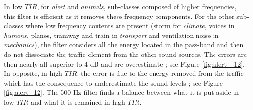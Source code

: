 \documentclass[twocolumn,a4paper,10pt]{article}
\begin{document}
In low $TIR$, for \textit{alert} and \textit{animals}, sub-classes composed of higher frequencies, this filter is efficient as it removes these frequency components. For the other sub-classes where low frequency contents are present (storm for \textit{climate}, voices in \textit{humans}, planes, tramway and train in \textit{transport} and ventilation noise in \textit{mechanics}), the filter considers all the energy located in the pass-band and then do not dissociate the traffic element from the other sound sources. The errors are then nearly all superior to 4 dB and are overestimate ; see Figure \ref{fig:alert_-12}. In opposite, in high $TIR$, the error is due to the energy removed from the traffic which has the consequence to underestimate the sound levels ; see Figure \ref{fig:alert_12}. The 500 Hz filter finds a balance between what it is put aside in low $TIR$ and what it is remained in high $TIR$. \\
\end{document}
